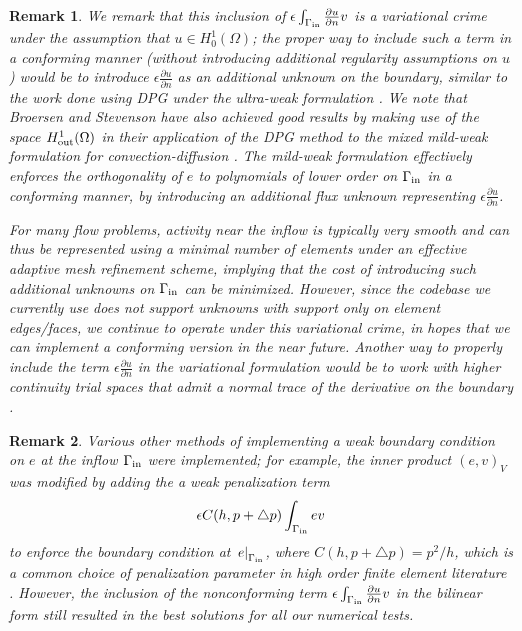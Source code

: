 \documentclass[final,leqno]{siamltex}
\newcommand{\LRp}[1]{\left( #1 \right)}
\newcommand{\pd}[2]{\frac{\partial#1}{\partial#2}}
\newtheorem{remark}{Remark}
\begin{document}
\begin{remark}
We remark that this inclusion of $\epsilon\int_{\Gamma_{\rm in}} \pd{u}{n}v$ is a variational crime under the assumption that $u \in H^1_0(\Omega)$; the proper way to include such a term in a conforming manner (without introducing additional regularity assumptions on $u$) would be to introduce $\epsilon \pd{u}{n}$ as an additional unknown on the boundary, similar to the work done using DPG under the ultra-weak formulation \cite{DPG2,analysisDPG}.  We note that Broersen and Stevenson have also achieved good results by making use of the space $H^1_{\rm out}(\Omega)$ in their application of the DPG method to the mixed mild-weak formulation for convection-diffusion \cite{broersenStevenson}.  The mild-weak formulation effectively enforces the orthogonality of $e$ to polynomials of lower order on $\Gamma_{\rm in}$ in a conforming manner, by introducing an additional flux unknown representing $\epsilon \pd{u}{n}$.  

For many flow problems, activity near the inflow is typically very smooth and can thus be represented using a minimal number of elements under an effective adaptive mesh refinement scheme, implying that the cost of introducing such additional unknowns on $\Gamma_{\rm in}$ can be minimized.  However, since the codebase we currently use does not support unknowns with support only on element edges/faces, we continue to operate under this variational crime, in hopes that we can implement a conforming version in the near future.  Another way to properly include the term $\epsilon \pd{u}{n}$ in the variational formulation would be to work with higher continuity trial spaces that admit a normal trace of the derivative on the boundary \cite{nurbsTrace, NURBSorig}.  
\end{remark}
\begin{remark}
Various other methods of implementing a weak boundary condition on $e$ at the inflow $\Gamma_{\rm in}$ were implemented; for example, the inner product $\LRp{e,v}_V$ was modified by adding the a weak penalization term $$\epsilon C(h,p+\triangle p)\int_{\Gamma_{\rm in}}ev $$ to enforce the boundary condition at $\left.e\right |_{\Gamma_{\rm in}}$, where $C(h,p+\triangle p) = p^2/h$, which is a common choice of penalization parameter in high order finite element literature \cite{nurbsTrace,Warburton20032765}. However, the inclusion of the nonconforming term $\epsilon\int_{\Gamma_{\rm in}} \pd{u}{n}v$ in the bilinear form still resulted in the best solutions for all our numerical tests.  
\end{remark}
\end{document}
